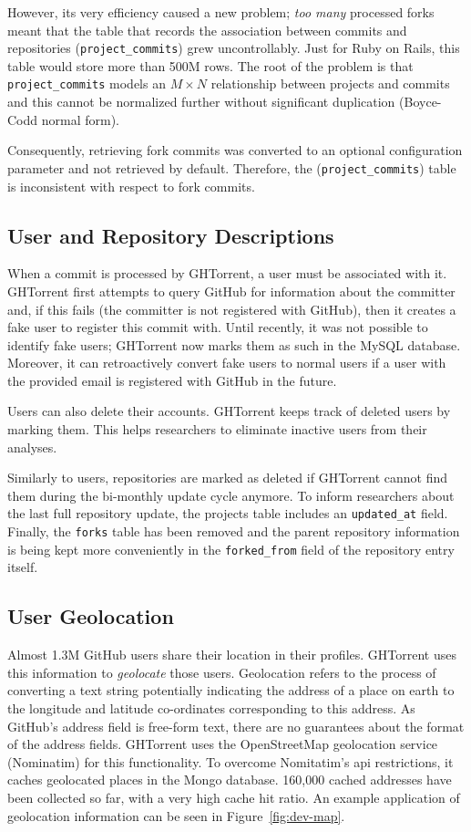 \documentclass{sig-alternate}
\begin{document}
However, its very efficiency caused a new problem; \emph{too many} processed
forks meant that the table that records the association between commits and
repositories (\texttt{project\_\-commits}) grew uncontrollably. Just for Ruby
on Rails, this table would store more than 500M rows. The root of the problem
is that \texttt{project\_commits} models an $M \times N$ relationship between
projects and commits and this cannot be normalized further without significant
duplication (Boyce-Codd normal form).

Consequently, retrieving fork commits was converted to an optional
configuration parameter and not retrieved by default. Therefore, the
(\texttt{project\_\-commits}) table is inconsistent with respect to
fork commits.

\subsection{User and Repository Descriptions}

When a commit is processed by GHTorrent, a user must be associated with it.
GHTorrent first attempts to query GitHub for information about the committer
and, if this fails (the committer is not registered with GitHub), then it
creates a fake user to register this commit with. Until recently, it was not
possible to identify fake users; GHTorrent now marks them as such in the MySQL
database. Moreover, it can retroactively convert fake users to normal users if
a user with the provided email is registered with GitHub in the future.

Users can also delete their accounts. GHTorrent keeps track of deleted users by
marking them. This helps researchers to eliminate inactive users from
their analyses.

Similarly to users, repositories are marked as deleted if GHTorrent cannot find
them during the bi-monthly update cycle anymore. To inform researchers about
the last full repository update, the projects table includes an
\texttt{updated\_at} field. Finally, the \texttt{forks} table has been removed
and the parent repository information is being kept more conveniently in the
\texttt{forked\_\-from} field of the repository entry itself.

\subsection{User Geolocation}

Almost 1.3M GitHub users share their location in their profiles. GHTorrent uses
this information to \emph{geolocate} those users. Geolocation refers to the
process of converting a text string potentially indicating the address of a
place on earth to the longitude and latitude co-ordinates corresponding to this
address. As GitHub's address field is free-form text, there are no guarantees
about the format of the address fields. GHTorrent uses the OpenStreetMap
geolocation service (Nominatim) for this functionality. To overcome Nomitatim's
{\sc api} restrictions, it caches geolocated places in the Mongo
database. 160,000 cached addresses have been collected so far, with a very high
cache hit ratio.  An example application of geolocation information can be seen
in Figure~\ref{fig:dev-map}.
\end{document}
